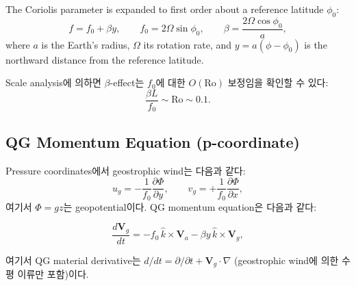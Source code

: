 \begin{definition}
The Coriolis parameter is expanded to first order about a reference latitude
$\phi_0$:
\begin{equation}\label{eq:beta-plane}
  f = f_0 + \beta y,
  \qquad
  f_0 = 2\Omega\sin\phi_0,
  \qquad
  \beta = \frac{2\Omega\cos\phi_0}{a},
\end{equation}
where $a$ is the Earth's radius, $\Omega$ its rotation rate, and
$y = a(\phi - \phi_0)$ is the northward distance from the reference latitude.
\end{definition}

\noindent
Scale analysis에 의하면 $\beta$-effect는 $f_0$에 대한 $O(\mathrm{Ro})$
보정임을 확인할 수 있다:
\begin{equation}\label{eq:beta-scaling}
  \frac{\beta L}{f_0} \sim \mathrm{Ro} \sim 0.1.
\end{equation}


\subsection{QG Momentum Equation (p-coordinate)}\label{subsec:qg-mom-p}

Pressure coordinates에서 geostrophic wind는 다음과 같다:
\begin{equation}\label{eq:geowind-p}
  u_g = -\frac{1}{f_0}\frac{\partial\Phi}{\partial y},
  \qquad
  v_g = +\frac{1}{f_0}\frac{\partial\Phi}{\partial x},
\end{equation}
여기서 $\Phi = gz$는 geopotential이다.  QG momentum equation은 다음과 같다:

\begin{equation}\label{eq:qg-mom-p}
  \boxed{
  \frac{d\mathbf{V}_g}{dt}
  = -f_0\,\hat{k}\times\mathbf{V}_a
    - \beta y\,\hat{k}\times\mathbf{V}_g,
  }
\end{equation}

\noindent
여기서 QG material derivative는
$d/dt = \partial/\partial t + \mathbf{V}_g\cdot\nabla$ (geostrophic wind에 의한
수평 이류만 포함)이다.


